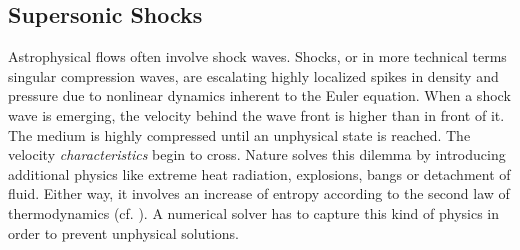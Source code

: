 \subsection{Supersonic Shocks}
\label{sec:theory-shocks}
Astrophysical flows often involve shock waves. Shocks, or in more technical
terms singular compression waves, are escalating highly localized spikes in
density and pressure due to nonlinear dynamics inherent to the Euler equation.
When a shock wave is emerging, the velocity behind the wave front is higher than
in front of it. The medium is highly compressed until an unphysical state is
reached. The velocity \emph{characteristics} begin to cross. Nature solves this
dilemma by introducing additional physics like extreme heat radiation,
explosions, bangs or detachment of fluid. Either way, it involves an increase
of entropy according to the second law of thermodynamics (cf.
\cite{Salas1996}). A numerical solver has to capture this kind of physics in
order to prevent unphysical solutions. 

